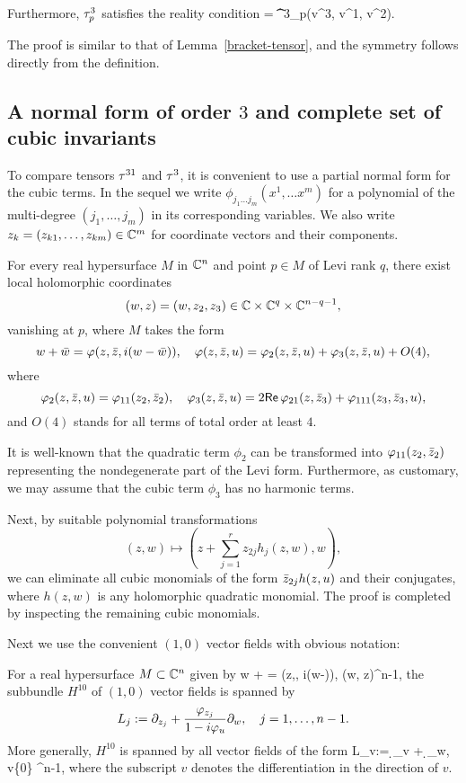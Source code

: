 \documentclass[12pt]{amsart}
\begin{document}
Furthermore, $\tau^3_p$ satisfies the reality condition
\beq{}
 = \t^3_p(\1v^3, \1v^1, \1v^2).
\eeq
\el

\bpf
The proof is similar to that of Lemma~\ref{bracket-tensor},
and the symmetry follows directly from the definition.
\epf



\subsection{A normal form of order $3$ and complete set of cubic invariants}
To compare tensors $\tau^{31}$ and $\tau^3$,
it is convenient to use a partial normal form
for the cubic terms.
In the sequel we write $\phi_{j_1\ldots j_m}(x^1,\ldots x^m)$
for a polynomial of the multi-degree $(j_1,\ldots, j_m)$
in its corresponding variables.
We also write 
$z_k=(z_{k1},\ldots, z_{km})\in {\mathbb{C}}^m$
for coordinate vectors and their components.

\bp{}
For every real hypersurface $M$ in ${\mathbb{C}}^{n}$ and point $p\in M$ of Levi rank $q$, 
there exist local holomorphic coordinates 
$$
	(w,z)=(w, z_2, z_3)\in {\mathbb{C}}\times {\mathbb{C}}^q\times {\mathbb{C}}^{n-q-1},
$$ 
vanishing at $p$,
where $M$ takes the form
$$
	w + {\bar w} = \varphi(z,{\bar z}, i(w-{\bar w})), 
	\quad
	\varphi(z,{\bar z},u) = \varphi_2(z,{\bar z},u) + \varphi_3(z,{\bar z},u) + O(4), 
$$
where
$$
	\varphi_2(z,{\bar z},u) = \varphi_{11}(z_2, {\bar z}_2),
	\quad
	\varphi_3(z,{\bar z},u) = 2{\sf Re}\, \varphi_{21}(z,{\bar z}_3) + \varphi_{111}(z_3, {\bar z}_3, u),
$$
and $O(4)$ stands for all terms of total order at least $4$.
\ep


\bpf
It is well-known that the quadratic term $\phi_2$ 
can be transformed into $\varphi_{11}(z_2, {\bar z}_2)$ 
representing the nondegenerate part of the Levi form.
Furthermore, as customary, we may assume that the cubic term $\phi_3$ has no harmonic terms.

Next, by suitable polynomial transformations 
$$
	(z,w)\mapsto (z + \sum_{j=1}^r z_{2j} h_j(z,w) , w),
$$
we can eliminate all cubic monomials of the form ${\bar z}_{2j} h(z,u)$
and their conjugates, where $h(z,w)$ is any holomorphic quadratic monomial.
The proof is completed by inspecting the remaining cubic monomials.
\epf

Next we use the convenient $(1,0)$ vector fields with obvious notation:

\bl{}
For a real hypersurface $M\subset {\mathbb{C}}^{n}$ given by
\beq{}
	w + \w = \phi(z,\z, i(w-\w)), \quad (w, z)\in\C\times \C^{n-1},
\eeq
the subbundle $H^{10}$ of $(1,0)$ vector fields is spanned by
$$
	L_j := \partial_{z_j} + \frac{\varphi_{z_j}}{1-i\varphi_u} \partial_w, 
	\quad 
	j=1,\ldots, n-1.
$$
More generally, $H^{10}$ is spanned by all vector fields of the form
\beq{}
	L_v:= \d_v +  \d_w, 
	\quad v\in \{0\} \times \C^{n-1},
\eeq
where the subscript $v$ denotes the differentiation in the direction of $v$.
\el
\end{document}
